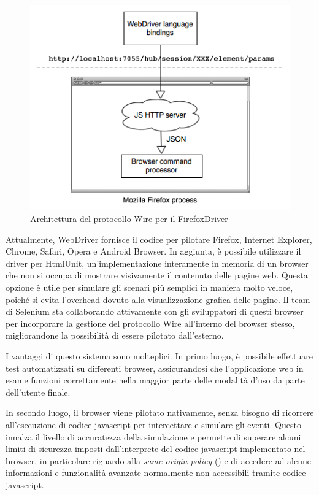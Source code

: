 \begin{figure}[htbp]
\begin{center}
\includegraphics[width=\textwidth]{images/webdriver_firefox.png}
\caption{Architettura del protocollo Wire per il FirefoxDriver}
\label{fig:webdriverFirefox}
\end{center}
\end{figure} 

Attualmente, WebDriver fornisce il codice per pilotare Firefox, Internet Explorer, Chrome, Safari, Opera e Android Browser. In aggiunta, è possibile utilizzare il driver per HtmlUnit, un'implementazione interamente in memoria di un browser che non si occupa di mostrare visivamente il contenuto delle pagine web. Questa opzione è utile per simulare gli scenari più semplici in maniera molto veloce, poiché si evita l'overhead dovuto alla visualizzazione grafica delle pagine. 
Il team di Selenium sta collaborando attivamente con gli sviluppatori di questi browser per incorporare la gestione del protocollo Wire all'interno del browser stesso, migliorandone la possibilità di essere pilotato dall'esterno. 

I vantaggi di questo sistema sono molteplici. In primo luogo, è possibile effettuare test automatizzati su differenti browser, assicurandosi che l'applicazione web in esame funzioni correttamente nella maggior parte delle modalità d'uso da parte dell'utente finale. 

In secondo luogo, il browser viene pilotato nativamente, senza bisogno di ricorrere all'esecuzione di codice javascript per intercettare e simulare gli eventi. Questo innalza il livello di accuratezza della simulazione e permette di superare alcuni limiti di sicurezza imposti dall'interprete del codice javascript implementato nel browser, in particolare riguardo alla \emph{same origin policy} (\cite{sameOrigin}) e di accedere ad alcune informazioni e funzionalità avanzate normalmente non accessibili tramite codice javascript.

